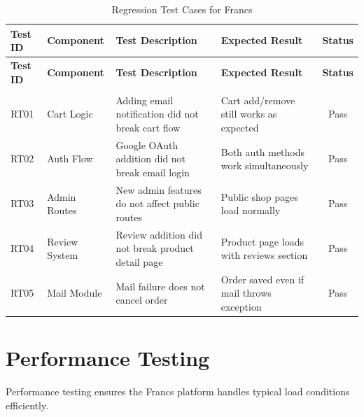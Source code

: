 \renewcommand{\arraystretch}{1.3}
\begin{longtable}{|p{1.5cm}|p{2.5cm}|p{4cm}|p{3.5cm}|c|}
    \hline
    \textbf{Test ID} & \textbf{Component} & \textbf{Test Description} & \textbf{Expected Result} & \textbf{Status} \\
    \hline
    \endfirsthead
    \hline
    \textbf{Test ID} & \textbf{Component} & \textbf{Test Description} & \textbf{Expected Result} & \textbf{Status} \\
    \hline
    \endhead
    \hline
    \endfoot
    \hline
    \caption{Regression Test Cases for Francs} \label{tab:regression_tests} \\
    \endlastfoot
    RT01 & Cart Logic & \raggedright Adding email notification did not break cart flow & \raggedright Cart add/remove still works as expected & Pass \\
    \hline
    RT02 & Auth Flow & \raggedright Google OAuth addition did not break email login & \raggedright Both auth methods work simultaneously & Pass \\
    \hline
    RT03 & Admin Routes & \raggedright New admin features do not affect public routes & \raggedright Public shop pages load normally & Pass \\
    \hline
    RT04 & Review System & \raggedright Review addition did not break product detail page & \raggedright Product page loads with reviews section & Pass \\
    \hline
    RT05 & Mail Module & \raggedright Mail failure does not cancel order & \raggedright Order saved even if mail throws exception & Pass \\
    \hline
\end{longtable}

\newpage
\section{Performance Testing}
Performance testing ensures the Francs platform handles typical load conditions efficiently.

